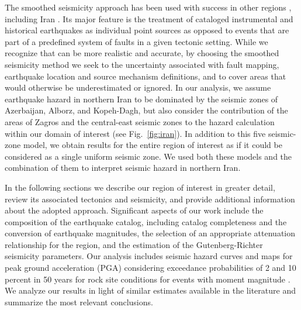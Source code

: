  The smoothed seismicity approach has been used with success in other regions \citep[e.g.][]{Cao1996, Akinci2004, Kalkan2009}, including Iran \citep{Khodaverdian_2016_BSSA}.  Its major feature is the treatment of cataloged instrumental and historical earthquakes as individual point sources as opposed to events that are part of a predefined system of faults in a given tectonic setting. While we recognize that  can be more realistic and accurate, by choosing the smoothed seismicity method we seek to  the uncertainty associated with fault mapping, earthquake location and source mechanism definitions, and to cover areas that would otherwise be underestimated or ignored. In our analysis, we assume earthquake hazard in northern Iran to be dominated by the seismic zones of Azerbaijan, Alborz, and Kopeh-Dagh, but also consider the contribution of the areas of Zagros and the central-east seismic zones to the hazard calculation within our domain of interest (see Fig.~\ref{fig:iran}). In addition to this five seismic-zone model, we obtain results for the entire region of interest as if it could be considered as a single uniform seismic zone. We used both these models and the combination of them to interpret seismic hazard in northern Iran.

In the following sections we describe our region of interest in greater detail, review its associated tectonics and seismicity, and provide additional information about the adopted approach. Significant aspects of our work include the composition of the earthquake catalog, including catalog completeness and the conversion of earthquake magnitudes, the selection of an appropriate attenuation relationship for the region, and the estimation of the Gutenberg-Richter seismicity parameters. Our analysis includes seismic hazard curves and maps for peak ground acceleration (PGA) considering exceedance probabilities of 2 and 10 percent in 50 years for rock site conditions for events with moment magnitude . We analyze our results in light of similar estimates available in the literature and summarize the most relevant conclusions.

